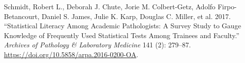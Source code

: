 \documentclass[
]{article}
\begin{document}
\leavevmode\hypertarget{ref-Schmidt2017}{}%
Schmidt, Robert L., Deborah J. Chute, Jorie M. Colbert-Getz, Adolfo
Firpo-Betancourt, Daniel S. James, Julie K. Karp, Douglas C. Miller, et
al. 2017. ``Statistical Literacy Among Academic Pathologists: A Survey
Study to Gauge Knowledge of Frequently Used Statistical Tests Among
Trainees and Faculty.'' \emph{Archives of Pathology \& Laboratory
Medicine} 141 (2): 279--87.
\url{https://doi.org/10.5858/arpa.2016-0200-OA}.
\end{document}
